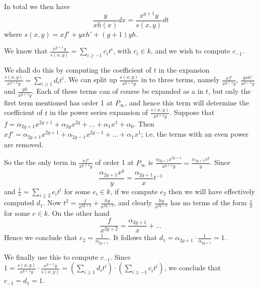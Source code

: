 \documentclass[draft, 11pt]{article} %
\theoremstyle{plain}
\theoremstyle{remark}
\begin{document}
In total we then have
\[
\frac{y}{xh(x)}dx = \frac{x^{g+1}y}{s(x,y)}dt
\]
where $s(x,y) = xf' + yxh' + (g+1)yh$.

We know that $\frac{x^{g+1}y}{s(x,y)} = \sum_{i\geq -1} c_i t^i$, with $c_i \in k$, and we wish to compute $c_{-1}$.

We shall do this by computing the coefficient of $t$ in the expansion $\frac{s(x,y)}{x^{g+1}y} = \sum_{i\geq 1}d_it^i$.
We can split up $\frac{s(x,y)}{x^{g+1}y}$ in to three terms, namely $\frac{xf'}{x^{g+1}y}$, $\frac{yxh'}{x^{g+1}y}$ and $\frac{yh}{x^{g+1}y}$.
Each of these terms can of course be expanded as a in $t$, but only the first term mentioned has order 1 at $P_\infty$, and hence this term will determine the coefficient of $t$ in the power series expansion of $\frac{s(x,y)}{x^{g+1}y}$.
Suppose that $f = \alpha_{2g+1}x^{2g+1} + \alpha_{2g}x^{2g} + \ldots + \alpha_1x^1 + \alpha_0$.
Then $xf'= \alpha_{2g+1}x^{2g+1} + \alpha_{2g-1}x^{2g-1} + \ldots + \alpha_1x^1$; i.e. the terms with an even power are removed.

So the the only term in $\frac{xf'}{x^{g+1}y}$ of order 1 at $P_\infty$ is $\frac{\alpha_{2g+1}x^{2g+1}}{x^{g+1}y} = \frac{\alpha_{2g+1}x^{g}}{y}$.
Since
\[
\frac{\alpha_{2g+1}x^g}{y} = \frac{\alpha_{2g+1}}{x}t^{-1}
\]
and $\frac{1}{x} = \sum_{i\geq 2}e_it^i$ for some $e_i \in k$, if we compute $e_2$ then we will have effectively computed $d_1$.
Now $t^2 = \frac{f }{x^{2g+2}}+ \frac{hy}{x^{2g+2}}$, and clearly $\frac{hy}{x^{2g+2}}$ has no terms of the form $\frac{c}{x}$ for some $c \in k$. 
On the other hand
\[
\frac{f}{x^{2g+2}} = \frac{\alpha_{2g+1}}{x} + \ldots
\]
Hence we conclude that $e_2 = \frac{1}{\alpha_{2g+1}}$.
It follows that $d_1 = \alpha_{2g+1} \cdot \frac{1}{\alpha_{2g+1}} = 1$.


We finally use this to compute $c_{-1}$.
Since $1 = \frac{s(x,y)}{x^{g+1}y}\cdot \frac{x^{g+1}y}{s(x,y)} = \left( \sum_{i\geq 1}d_it^i \right) \cdot \left( \sum_{i\geq -1}c_it^i\right)$, we conclude that $c_{-1} = d_{1} = 1$.
\end{document}

